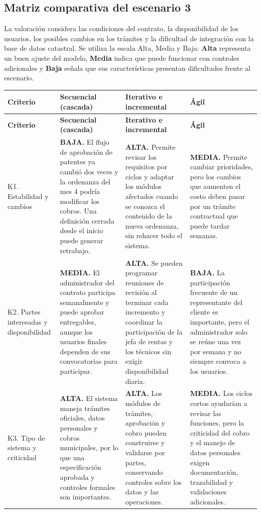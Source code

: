 \documentclass[10pt,letterpaper]{article}
\newcommand{\subtitulo}[1]{\subsection*{\textcolor{azul}{#1}}}
\begin{document}
\par
\subtitulo{Matriz comparativa del escenario 3}
\par
La valoración considera las condiciones del contrato, la disponibilidad de los usuarios, los posibles cambios en los trámites y la dificultad de integración con la base de datos catastral. Se utiliza la escala Alta, Media y Baja: \textbf{Alta} representa un buen ajuste del modelo, \textbf{Media} indica que puede funcionar con controles adicionales y \textbf{Baja} señala que sus características presentan dificultades frente al escenario.
\par
\scriptsize
\par
\begin{longtable}{@{}p{3.15cm}p{7.15cm}p{7.15cm}p{7.15cm}@{}}
\rowcolor{verde}\color{white}\textbf{Criterio}&\color{white}\textbf{Secuencial (cascada)}&\color{white}\textbf{Iterativo e incremental}&\color{white}\textbf{Ágil}\\\endfirsthead
\rowcolor{verde}\color{white}\textbf{Criterio}&\color{white}\textbf{Secuencial (cascada)}&\color{white}\textbf{Iterativo e incremental}&\color{white}\textbf{Ágil}\\\endhead
K1. Estabilidad y cambios&\textbf{BAJA.} El flujo de aprobación de patentes ya cambió dos veces y la ordenanza del mes 4 podría modificar los cobros. Una definición cerrada desde el inicio puede generar retrabajo.&\textbf{ALTA.} Permite revisar los requisitos por ciclos y adaptar los módulos afectados cuando se conozca el contenido de la nueva ordenanza, sin rehacer todo el sistema.&\textbf{MEDIA.} Permite cambiar prioridades, pero los cambios que aumenten el costo deben pasar por un trámite contractual que puede tardar semanas.\\\hline
K2. Partes interesadas y disponibilidad&\textbf{MEDIA.} El administrador del contrato participa semanalmente y puede aprobar entregables, aunque los usuarios finales dependen de sus convocatorias para participar.&\textbf{ALTA.} Se pueden programar reuniones de revisión al terminar cada incremento y coordinar la participación de la jefa de rentas y los técnicos sin exigir disponibilidad diaria.&\textbf{BAJA.} La participación frecuente de un representante del cliente es importante, pero el administrador solo se reúne una vez por semana y no siempre convoca a los usuarios.\\\hline
K3. Tipo de sistema y criticidad&\textbf{ALTA.} El sistema maneja trámites oficiales, datos personales y cobros municipales, por lo que una especificación aprobada y controles formales son importantes.&\textbf{ALTA.} Los módulos de trámites, aprobación y cobro pueden construirse y validarse por partes, conservando controles sobre los datos y las operaciones.&\textbf{MEDIA.} Los ciclos cortos ayudarían a revisar las funciones, pero la criticidad del cobro y el manejo de datos personales exigen documentación, trazabilidad y validaciones adicionales.\\\hline

\end{longtable}
\end{document}
